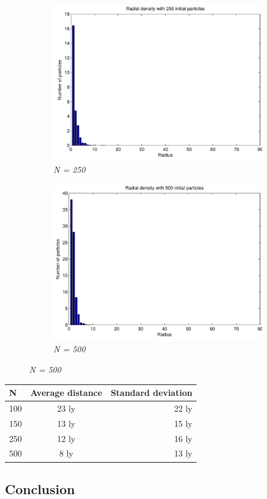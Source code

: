 \documentclass[a4paper,12pt, english]{article}
\begin{document}
\begin{figure}[H]
		\begin{subfigure}[b]{0.6\textwidth}
        \includegraphics[scale=0.5]{radial_density_250.pdf}
        \caption{\textit{N = 250}}
		\end{subfigure}
		
		\begin{subfigure}[b]{0.6\textwidth}
        \includegraphics[scale=0.5]{radial_density_500.pdf}
        \caption{\textit{N = 500}}
		\end{subfigure}
		
		\label{fig:radial density}       
				 
\end{figure}

\begin{tabular}{ l c r }
 N & Average distance & Standard deviation \\ 
 \hline 
  100 & 23 ly & 22 ly \\
  150 &  13 ly & 15 ly \\
  250 & 12 ly & 16 ly \\
  500 & 8 ly & 13 ly \\
\end{tabular}

\subsection*{Conclusion}
 
\end{document}
